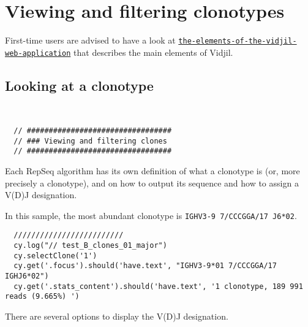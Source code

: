 \section{Viewing and filtering clonotypes}

First-time users are advised to have a look at \href{https://www.vidjil.org/doc/user/#the-elements-of-the-vidjil-web-application}{\tt the-elements-of-the-vidjil-web-application} that describes the main elements of Vidjil.

\subsection{Looking at a clonotype}
\begin{verbatim}


  // #################################
  // ### Viewing and filtering clones
  // #################################

\end{verbatim}


Each RepSeq algorithm has its own definition of what a clonotype is (or, more precisely
a clonotype), and on how to output its sequence and how to assign a V(D)J designation.

In this sample, the most abundant clonotype
is \texttt{IGHV3-9 7/CCCGGA/17 J6*02}.



\begin{verbatim}
  /////////////////////////
  cy.log("// test_B_clones_01_major")
  cy.selectClone('1')
  cy.get('.focus').should('have.text', "IGHV3-9*01 7/CCCGGA/17 IGHJ6*02")
  cy.get('.stats_content').should('have.text', '1 clonotype, 189 991 reads (9.665%) ')

\end{verbatim}


There are several options to display the V(D)J designation.


